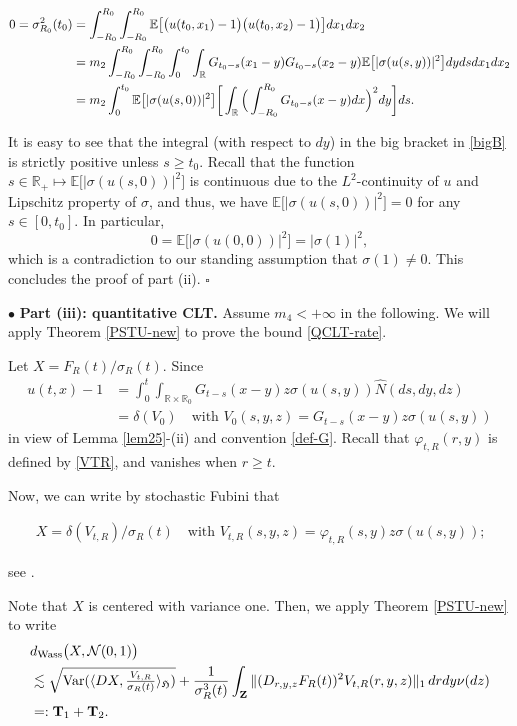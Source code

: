 \documentclass[letterpaper, 11pt,  reqno]{amsart}
\newcommand{\wh}{\widehat}
\newcommand{\noi}{\noindent}
\newcommand{\R}{\mathbb{R}}
\newcommand{\bul}{\bullet}
\newcommand{\bE}{\mathbb{E}}
\newcommand{\E}{\mathbb{E}}
\newcommand{\cN}{\mathcal{N}}
\newcommand{\dl}{\delta}
\newcommand{\s}{\sigma}
\newcommand{\les}{\lesssim}
\newcommand{\jb}[1]
{\langle #1 \rangle}
\newcommand{\Var}{\textup{Var}}
\newcommand{\fH}{\mathfrak{H}}
\numberwithin{equation}{section}
\numberwithin{theorem}{section}
\begin{document}
\noi
\begin{align}
0 = \s_{R_0}^2(t_0)&=  \int_{-R_0}^{R_0} \int_{-R_0}^{R_0}  \E\big[\big(u(t_0,x_1)-1\big)\big(u(t_0, x_2)-1\big)\big]dx_1 dx_2  \notag\\
&=m_2  \int_{-R_0}^{R_0} \int_{-R_0}^{R_0} \int_0^{t_0} 
\int_{\R} G_{t_0-s}(x_1-y) G_{t_0-s}(x_2-y) \E\big[|\s(u(s,y))|^2\big] dyds dx_1 dx_2 \notag \\
&=m_2  \int_0^{t_0} \bE\big[|\s(u(s,0))|^2\big]   
\bigg[ \int_\R   \Big( \int_{-R_0}^{R_0} G_{t_0 -s}(x-y)  dx \Big)^2   dy \bigg]     ds. \label{bigB}
\end{align}

\noi
It is easy to see that the integral (with respect to $dy$) in the big bracket in \eqref{bigB}
is strictly positive unless $s \geq t_0$.
Recall that the function $s\in\R_+ \mapsto \bE\big[|\s(u(s,0))|^2\big]  $ is continuous
due to the $L^2$-continuity of $u$ and Lipschitz property of $\s$,
and thus,  we have $\bE\big[|\s(u(s,0))|^2\big] =0$ for any $s\in[0, t_0].$
In particular, 
\[
0 =  \bE\big[|\s(u(0,0))|^2\big]=|\s(1)|^2,
\] 
 which is a contradiction to our standing assumption that $\s(1) \neq 0$.
 This concludes the proof of part (ii). 
  \hfill $\square$


\smallskip

\noi
$\bul$ 
 \textbf{Part (iii): \textsf{quantitative  CLT}.} 
 Assume $m_4 < + \infty$ in the following. We will apply Theorem \ref{PSTU-new}
 to prove the bound  \eqref{QCLT-rate}.
 
Let $X = F_R(t) / \s_R(t)$. Since
 \begin{align*}
 u(t, x) - 1 
 &= \int_0^t \int_{\R\times\R_0} G_{t-s}(x-y)z \s( u(s,y) ) \wh{N}(ds, dy, dz) \\
  &= \dl( V_0  )\quad\text{with $V_0(s,y, z) = G_{t-s}(x-y)z \s( u(s,y) )$}
 \end{align*}
 in view of Lemma \ref{lem25}-(ii) and convention \eqref{def-G}.
Recall that $\varphi_{t,R}(r,y)$ is defined by \eqref{VTR}, and vanishes when $r\geq t$.


Now,   we can write by stochastic  Fubini that  
 
 \noi
 \begin{align}\label{vectorV}
 X =  \dl (V_{t, R})/ \s_R(t)
  \quad\text{with $V_{t, R}  (s,y, z) = \varphi_{t, R}(s, y) z \s( u(s,y) )$;}
 \end{align}
 
 \noi
 see \cite[Lemma 2.6]{BZ23}.
 

Note that $X$ is centered with variance one. Then, we apply  
Theorem \ref{PSTU-new}   to write 
\begin{align}  \label{Qa}
\begin{aligned} 
&d_{\rm Wass}\big( X,  \cN(0,1)  \big) \\
&\les  \sqrt{\Var( \jb{ DX,  \tfrac{V_{t, R}}{ \s_R(t) }  }_\fH)} +
\frac{1}{\s^3_R(t)} \int_{\mathbf{Z}} \| (D_{r, y,z} F_R(t) )^2 V_{t, R} (r, y, z) \|_1 \, drdy\nu(dz) \\
&=: \mathbf{T}_1 +  \mathbf{T}_2.
\end{aligned}
\end{align}
\end{document}
